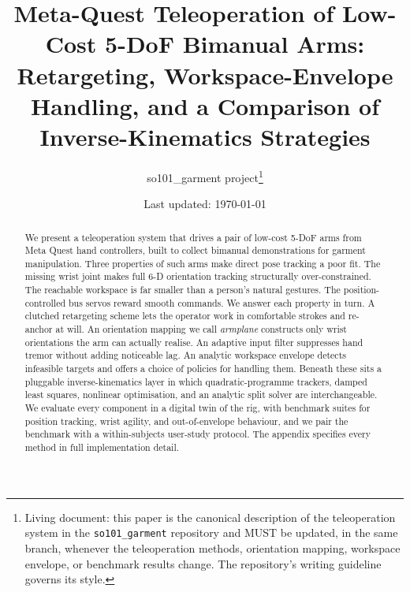 \documentclass[10pt]{article}
\title{Meta-Quest Teleoperation of Low-Cost 5-DoF Bimanual Arms:
Retargeting, Workspace-Envelope Handling, and a Comparison of
Inverse-Kinematics Strategies}
\author{so101\_garment project\thanks{Living document: this paper is the
canonical description of the teleoperation system in the
\texttt{so101\_garment} repository and MUST be updated, in the same
branch, whenever the teleoperation methods, orientation mapping,
workspace envelope, or benchmark results change. The repository's
writing guideline governs its style.}}
\date{Last updated: \today}
\begin{document}
\maketitle

\begin{abstract}
We present a teleoperation system that drives a pair of low-cost 5-DoF
arms from Meta Quest hand controllers, built to collect bimanual
demonstrations for garment manipulation. Three properties of such arms
make direct pose tracking a poor fit. The missing wrist joint makes full
6-D orientation tracking structurally over-constrained. The reachable
workspace is far smaller than a person's natural gestures. The
position-controlled bus servos reward smooth commands. We answer each
property in turn. A clutched retargeting scheme lets the operator work in
comfortable strokes and re-anchor at will. An orientation mapping we call
\emph{armplane} constructs only wrist orientations the arm can actually
realise. An adaptive input filter suppresses hand tremor without adding
noticeable lag. An analytic workspace envelope detects infeasible targets
and offers a choice of policies for handling them. Beneath these sits a
pluggable inverse-kinematics layer in which quadratic-programme trackers,
damped least squares, nonlinear optimisation, and an analytic split
solver are interchangeable. We evaluate every component in a digital twin
of the rig, with benchmark suites for position tracking, wrist agility,
and out-of-envelope behaviour, and we pair the benchmark with a
within-subjects user-study protocol. The appendix specifies every method
in full implementation detail.
\end{abstract}












\appendix

\end{document}
